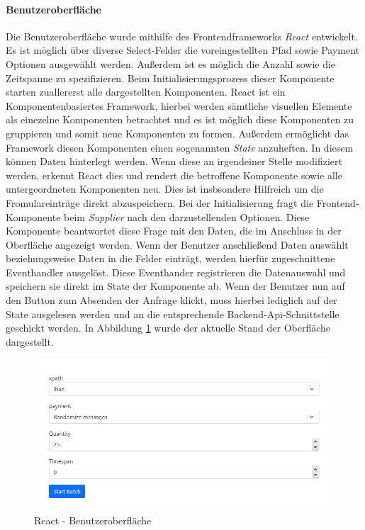 \paragraph{Benutzeroberfläche}
Die Benutzeroberfläche wurde mithilfe des Frontendframeworks \emph{React} entwickelt. Es ist möglich über diverse Select-Felder die voreingestellten Pfad sowie Payment Optionen ausgewählt werden. Außerdem ist es möglich die Anzahl sowie die Zeitspanne zu spezifizieren. Beim Initialisierungsprozess dieser Komponente starten zuallererst alle dargestellten Komponenten. React ist ein Komponentenbasiertes Framework, hierbei werden sämtliche visuellen Elemente als einezelne Komponenten betrachtet und es ist möglich diese Komponenten zu gruppieren und somit neue Komponenten zu formen. Außerdem ermöglicht das Framework diesen Komponenten einen sogenannten \emph{State} anzuheften. In diesem können Daten hinterlegt werden. Wenn diese an irgendeiner Stelle modifiziert werden, erkennt React dies und rendert die betroffene Komponente sowie alle untergeordneten Komponenten neu. Dies ist insbsondere Hilfreich um die Fromulareinträge direkt abzuspeichern. Bei der Initialisierung fragt die Frontend-Komponente beim \emph{Supplier} nach den darzustellenden Optionen. Diese Komponente beantwortet diese Frage mit den Daten, die im Anschluss in der Oberfläche angezeigt werden. Wenn der Benutzer anschließend Daten auswählt beziehungsweise Daten in die Felder einträgt, werden hierfür zugeschnittene Eventhandler ausgelöst. Diese Eventhander registrieren die Datenauswahl und speichern sie direkt im State der Komponente ab. Wenn der Benutzer nun auf den Button zum Absenden der Anfrage klickt, muss hierbei lediglich auf der State ausgelesen werden und an die entsprechende Backend-Api-Schnittstelle geschickt werden. In Abbildung \ref{fig:reactUi} wurde der aktuelle Stand der Oberfläche dargestellt.

\begin{figure}[ht!]
	\centering
	\includegraphics[width=.9\linewidth]{kapitel/problemloesung/implementierung/_img/react01}
	\caption[React - Benutzeroberfläche]{React - Benutzeroberfläche}
	\label{fig:reactUi}
\end{figure}


